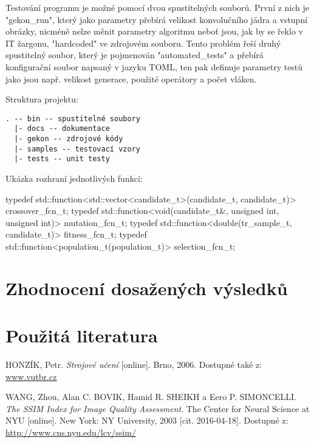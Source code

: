 \documentclass[a4paper,11pt]{scrartcl}
\begin{document}
Testování programu je možné pomocí dvou spustitelných souborů. První z nich je "gekon\_run", který jako parametry přebírá velikost konvolučního jádra a vstupní obrázky, nicméně nelze měnit parametry algoritmu neboť jsou, jak by se řeklo v IT žargonu, "hardcoded" ve zdrojovém souboru. Tento problém řeší druhý spustitelný soubor, který je pojmenován "automated\_tests" a přebírá konfigurační soubor napsaný v jazyku TOML, ten pak definuje parametry testů jako jsou např. velikost generace, použité operátory a počet vláken.

Struktura projektu:
\begin{verbatim}
. -- bin -- spustitelné soubory
  |- docs -- dokumentace
  |- gekon -- zdrojové kódy
  |- samples -- testovací vzory
  |- tests -- unit testy
\end{verbatim}

Ukázka rozhraní jednotlivých funkcí:
\begin{cppcode}
typedef std::function<std::vector<candidate_t>(candidate_t, candidate_t)> crossover_fcn_t;
typedef std::function<void(candidate_t&, unsigned int, unsigned int)> mutation_fcn_t;
typedef std::function<double(tr_sample_t, candidate_t)> fitness_fcn_t;
typedef std::function<population_t(population_t)> selection_fcn_t;
\end{cppcode}

\section{Zhodnocení dosažených výsledků}

\section{Použitá literatura}

\begin{thebibliography}{9}
 
HONZÍK, Petr. \emph{Strojové učení} [online]. Brno, 2006. Dostupné také z: \url{www.vutbr.cz}

WANG, Zhou, Alan C. BOVIK, Hamid R. SHEIKH a Eero P. SIMONCELLI. \emph{The SSIM Index for Image Quality Assessment}. The Center for Neural Science at NYU [online]. New York: NY University, 2003 [cit. 2016-04-18]. Dostupné z: \url{http://www.cns.nyu.edu/lcv/ssim/}

\end{thebibliography}
\end{document}
